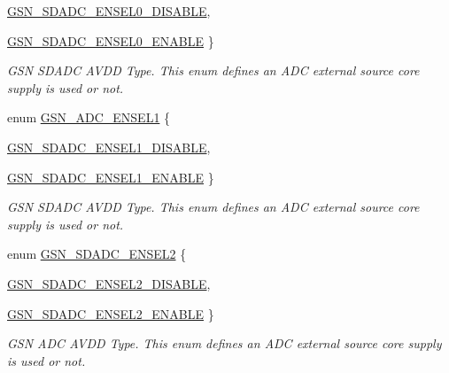 \begin{DoxyCompactItemize}
\hyperlink{a00652_gga6258977695af5f9fbae5edbdc75d8387ab2910f640d0e35d0f2bd00c6dba7adc2}{GSN\_\-SDADC\_\-ENSEL0\_\-DISABLE}, 
\par
\hyperlink{a00652_gga6258977695af5f9fbae5edbdc75d8387a8ce1af0f3cd79de783d7e860d70ad54f}{GSN\_\-SDADC\_\-ENSEL0\_\-ENABLE}
 \}
\begin{DoxyCompactList}\small\item\em GSN SDADC AVDD Type. This enum defines an ADC external source core supply is used or not. \end{DoxyCompactList}\item 
enum \hyperlink{a00652_ga7c8cd0e1bbc6163fd01b12c7f31f0550}{GSN\_\-ADC\_\-ENSEL1} \{ \par
\hyperlink{a00652_gga7c8cd0e1bbc6163fd01b12c7f31f0550a7f18f093a813a23aac7a7602cec80767}{GSN\_\-SDADC\_\-ENSEL1\_\-DISABLE}, 
\par
\hyperlink{a00652_gga7c8cd0e1bbc6163fd01b12c7f31f0550a20f123d417c8be249c802178812e6f25}{GSN\_\-SDADC\_\-ENSEL1\_\-ENABLE}
 \}
\begin{DoxyCompactList}\small\item\em GSN SDADC AVDD Type. This enum defines an ADC external source core supply is used or not. \end{DoxyCompactList}\item 
enum \hyperlink{a00652_ga940370ff6d2765c622f7687f6e6eee6a}{GSN\_\-SDADC\_\-ENSEL2} \{ \par
\hyperlink{a00652_gga940370ff6d2765c622f7687f6e6eee6aafd1575cfcab6f04a11fb0a7227ef7e85}{GSN\_\-SDADC\_\-ENSEL2\_\-DISABLE}, 
\par
\hyperlink{a00652_gga940370ff6d2765c622f7687f6e6eee6aa9f10996b807e2d9a21309e1b2b888210}{GSN\_\-SDADC\_\-ENSEL2\_\-ENABLE}
 \}
\begin{DoxyCompactList}\small\item\em GSN ADC AVDD Type. This enum defines an ADC external source core supply is used or not. \end{DoxyCompactList}\end{DoxyCompactItemize}

